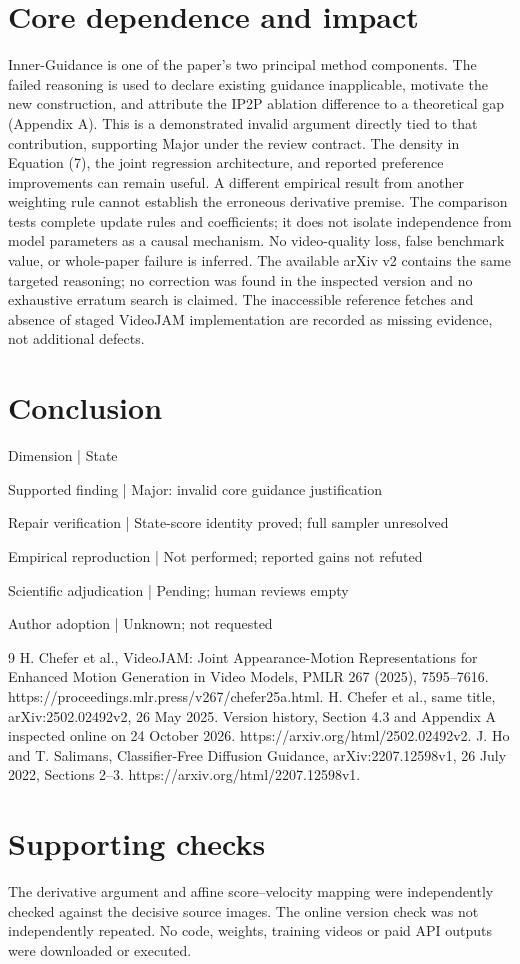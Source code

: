 \documentclass[10pt]{article}
\begin{document}
\section*{Core dependence and impact}
Inner-Guidance is one of the paper’s two principal method components. The failed reasoning is used to declare existing guidance inapplicable, motivate the new construction, and attribute the IP2P ablation difference to a theoretical gap (Appendix A). This is a demonstrated invalid argument directly tied to that contribution, supporting Major under the review contract. The density in Equation (7), the joint regression architecture, and reported preference improvements can remain useful. A different empirical result from another weighting rule cannot establish the erroneous derivative premise. The comparison tests complete update rules and coefficients; it does not isolate independence from model parameters as a causal mechanism. No video-quality loss, false benchmark value, or whole-paper failure is inferred. The available arXiv v2 contains the same targeted reasoning; no correction was found in the inspected version and no exhaustive erratum search is claimed. The inaccessible reference fetches and absence of staged VideoJAM implementation are recorded as missing evidence, not additional defects.\par
\section*{Conclusion}
Dimension | State\par
Supported finding | Major: invalid core guidance justification\par
Repair verification | State-score identity proved; full sampler unresolved\par
Empirical reproduction | Not performed; reported gains not refuted\par
Scientific adjudication | Pending; human reviews empty\par
Author adoption | Unknown; not requested\par
9 H. Chefer et al., VideoJAM: Joint Appearance-Motion Representations for Enhanced Motion Generation in Video Models, PMLR 267 (2025), 7595–7616. https://proceedings.mlr.press/v267/chefer25a.html. H. Chefer et al., same title, arXiv:2502.02492v2, 26 May 2025. Version history, Section 4.3 and Appendix A inspected online on 24 October 2026. https://arxiv.org/html/2502.02492v2. J. Ho and T. Salimans, Classifier-Free Diffusion Guidance, arXiv:2207.12598v1, 26 July 2022, Sections 2–3. https://arxiv.org/html/2207.12598v1.\par
\section*{Supporting checks}
The derivative argument and affine score–velocity mapping were independently checked against the decisive source images. The online version check was not independently repeated. No code, weights, training videos or paid API outputs were downloaded or executed.\par
\end{document}

